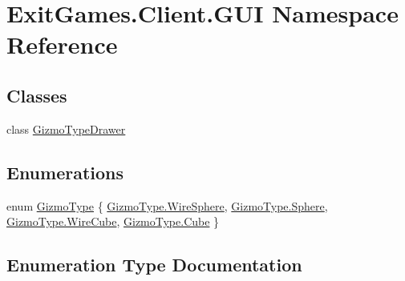 \hypertarget{namespace_exit_games_1_1_client_1_1_g_u_i}{}\section{Exit\+Games.\+Client.\+G\+UI Namespace Reference}
\label{namespace_exit_games_1_1_client_1_1_g_u_i}
\subsection*{Classes}
\begin{DoxyCompactItemize}
\item 
class \hyperlink{class_exit_games_1_1_client_1_1_g_u_i_1_1_gizmo_type_drawer}{Gizmo\+Type\+Drawer}
\end{DoxyCompactItemize}
\subsection*{Enumerations}
\begin{DoxyCompactItemize}
\item 
enum \hyperlink{namespace_exit_games_1_1_client_1_1_g_u_i_a818c6c37f51ee72cef59e460e7295d65}{Gizmo\+Type} \{ \hyperlink{namespace_exit_games_1_1_client_1_1_g_u_i_a818c6c37f51ee72cef59e460e7295d65ab37d9c6b396307dda685c3c65c20e359}{Gizmo\+Type.\+Wire\+Sphere}, 
\hyperlink{namespace_exit_games_1_1_client_1_1_g_u_i_a818c6c37f51ee72cef59e460e7295d65ab7095f057db3fefa7325ad93a04e14fd}{Gizmo\+Type.\+Sphere}, 
\hyperlink{namespace_exit_games_1_1_client_1_1_g_u_i_a818c6c37f51ee72cef59e460e7295d65a70ab99161d5df5bb7e0edb7407f65483}{Gizmo\+Type.\+Wire\+Cube}, 
\hyperlink{namespace_exit_games_1_1_client_1_1_g_u_i_a818c6c37f51ee72cef59e460e7295d65aa296104f0c61a9cf39f4824d05315e12}{Gizmo\+Type.\+Cube}
 \}
\end{DoxyCompactItemize}


\subsection{Enumeration Type Documentation}
